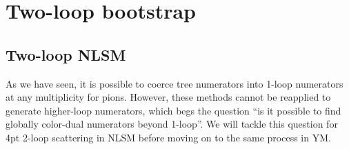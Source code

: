 \documentclass[11pt,letter]{article}
\begin{document}
\section{Two-loop bootstrap}

\subsection{Two-loop NLSM}
\label{sec:pions}

As we have seen, it is possible to coerce tree numerators into 1-loop numerators at any multiplicity for pions.
However, these methods cannot be reapplied to generate higher-loop numerators, which begs the question ``is it possible to find globally color-dual numerators beyond 1-loop''.
We will tackle this question for 4pt 2-loop scattering in NLSM before moving on to the same process in YM.
\end{document}
